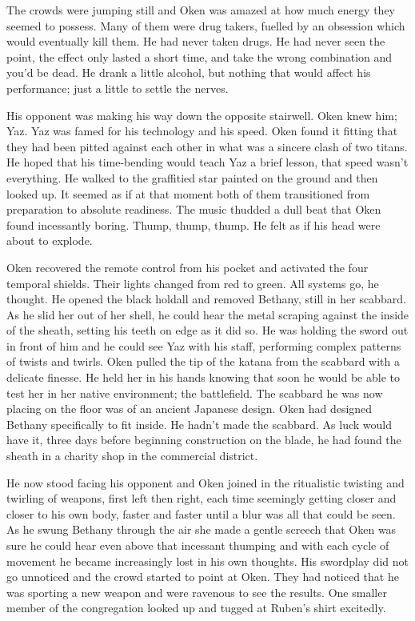 The crowds were jumping still and Oken was amazed at how much energy they seemed to possess. Many of them were drug takers, fuelled by an obsession which would eventually kill them. He had never taken drugs. He had never seen the point, the effect only lasted a short time, and take the wrong combination and you'd be dead. He drank a little alcohol, but nothing that would affect his performance; just a little to settle the nerves.

His opponent was making his way down the opposite stairwell. Oken knew him; Yaz. Yaz was famed for his technology and his speed. Oken found it fitting that they had been pitted against each other in what was a sincere clash of two titans. He hoped that his time-bending would teach Yaz a brief lesson, that speed wasn't everything. He walked to the graffitied star painted on the ground and then looked up. It seemed as if at that moment both of them transitioned from preparation to absolute readiness. The music thudded a dull beat that Oken found incessantly boring. Thump, thump, thump. He felt as if his head were about to explode.

Oken recovered the remote control from his pocket and activated the four temporal shields. Their lights changed from red to green. All systems go, he thought. He opened the black holdall and removed Bethany, still in her scabbard. As he slid her out of her shell, he could hear the metal scraping against the inside of the sheath, setting his teeth on edge as it did so. He was holding the sword out in front of him and he could see Yaz with his staff, performing complex patterns of twists and twirls. Oken pulled the tip of the katana from the scabbard with a delicate finesse. He held her in his hands knowing that soon he would be able to test her in her native environment; the battlefield. The scabbard he was now placing on the floor was of an ancient Japanese design. Oken had designed Bethany specifically to fit inside. He hadn't made the scabbard. As luck would have it, three days before beginning construction on the blade, he had found the sheath in a charity shop in the commercial district.

He now stood facing his opponent and Oken joined in the ritualistic twisting and twirling of weapons, first left then right, each time seemingly getting closer and closer to his own body, faster and faster until a blur was all that could be seen. As he swung Bethany through the air she made a gentle screech that Oken was sure he could hear even above that incessant thumping and with each cycle of movement he became increasingly lost in his own thoughts. His swordplay did not go unnoticed and the crowd started to point at Oken. They had noticed that he was sporting a new weapon and were ravenous to see the results. One smaller member of the congregation looked up and tugged at Ruben's shirt excitedly.

